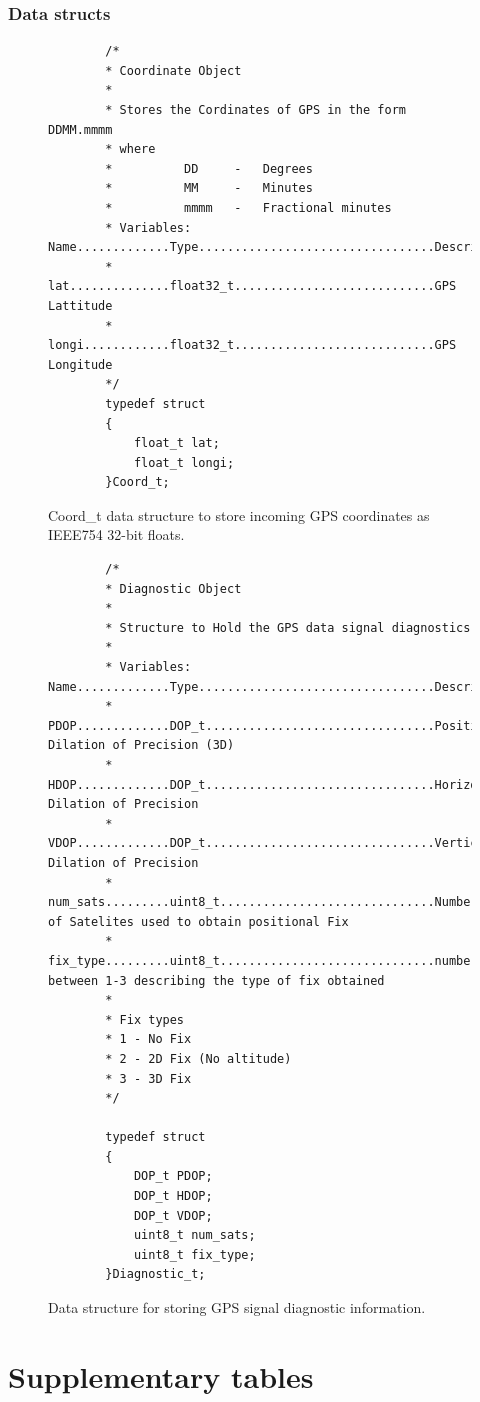 \subsection{Data structs}
\begin{figure}[H]
	\centering
	\begin{lstlisting}
		/*
		* Coordinate Object
		*
		* Stores the Cordinates of GPS in the form DDMM.mmmm
		* where 
		*          DD     -   Degrees
		*          MM     -   Minutes
		*          mmmm   -   Fractional minutes
		* Variables:	Name.............Type.................................Description
		* 				lat..............float32_t............................GPS Lattitude
		* 				longi............float32_t............................GPS Longitude
		*/
		typedef struct
		{
			float_t lat;
			float_t longi;
		}Coord_t;
	\end{lstlisting}    
	\caption{Coord\_t data structure to store incoming GPS coordinates as IEEE754 32-bit floats.}
	\label{fig:data_coord_t}
\end{figure}

\begin{figure}[H]
	\centering
	\begin{lstlisting}
		/*
		* Diagnostic Object
		*
		* Structure to Hold the GPS data signal diagnostics
		*
		* Variables:	Name.............Type.................................Description
		* 				PDOP.............DOP_t................................Positional Dilation of Precision (3D)
		* 				HDOP.............DOP_t................................Horizontal Dilation of Precision
		* 				VDOP.............DOP_t................................Vertical   Dilation of Precision
		* 				num_sats.........uint8_t..............................Number of Satelites used to obtain positional Fix
		* 				fix_type.........uint8_t..............................number between 1-3 describing the type of fix obtained
		*
		* Fix types
		* 1 - No Fix
		* 2 - 2D Fix (No altitude)
		* 3 - 3D Fix
		*/
		
		typedef struct
		{
			DOP_t PDOP;
			DOP_t HDOP;
			DOP_t VDOP;
			uint8_t num_sats;
			uint8_t fix_type;
		}Diagnostic_t;
	\end{lstlisting}
	\caption{Data structure for storing GPS signal diagnostic information.}
	\label{fig:data_Diagnostic_t}
\end{figure}


\chapter{Supplementary tables}

